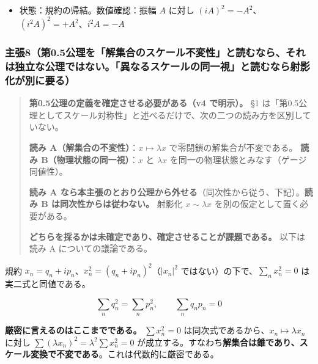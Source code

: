 \documentclass[
  10pt,
]{ltjsarticle}
\providecommand{\tightlist}{%
  \setlength{\itemsep}{0pt}\setlength{\parskip}{0pt}}
\begin{document}
\begin{itemize}
\tightlist
\item
  状態：規約の帰結。数値確認：振幅 \(A\) に対し
  \((iA)^2 = -A^2\)、\((i^2A)^2 = +A^2\)、\(i^2A = -A\)
\end{itemize}

\subsubsection{主張8（第0.5公理を「解集合のスケール不変性」と読むなら、それは独立な公理ではない。「異なるスケールの同一視」と読むなら射影化が別に要る）}\label{ux4e3bux5f358ux7b2c0.5ux516cux7406ux3092ux89e3ux96c6ux5408ux306eux30b9ux30b1ux30fcux30ebux4e0dux5909ux6027ux3068ux8aadux3080ux306aux3089ux305dux308cux306fux72ecux7acbux306aux516cux7406ux3067ux306fux306aux3044ux7570ux306aux308bux30b9ux30b1ux30fcux30ebux306eux540cux4e00ux8996ux3068ux8aadux3080ux306aux3089ux5c04ux5f71ux5316ux304cux5225ux306bux8981ux308b}

\begin{quote}
\textbf{第0.5公理の定義を確定させる必要がある（v4 で明示）。} §1
は「第0.5公理としてスケール対称性」と述べるだけで、次の二つの読み方を区別していない。

\textbf{読み A（解集合の不変性）}：\(x \mapsto \lambda x\)
で零閉鎖の解集合が不変である。 \textbf{読み
B（物理状態の同一視）}：\(x\) と \(\lambda x\)
を同一の物理状態とみなす（ゲージ同値性）。

\textbf{読み A
なら本主張のとおり公理から外せる}（同次性から従う、下記）。\textbf{読み
B は同次性からは従わない。} 射影化 \(x \sim \lambda x\)
を別の仮定として置く必要がある。

\textbf{どちらを採るかは未確定であり、確定させることが課題である。}
以下は読み A についての議論である。
\end{quote}

規約 \(x_n = q_n + ip_n\)、\(x_n^2 = (q_n+ip_n)^2\)（\(|x_n|^2\)
ではない）の下で、\(\sum_n x_n^2 = 0\) は実二式と同値である。

\[\sum_n q_n^2 = \sum_n p_n^2, \qquad \sum_n q_n p_n = 0\]

\textbf{厳密に言えるのはここまでである。} \(\sum x_n^2 = 0\)
は同次式であるから、\(x_n \mapsto \lambda x_n\) に対し
\(\sum(\lambda x_n)^2 = \lambda^2\sum x_n^2 = 0\)
が成立する。すなわち\textbf{解集合は錐であり、スケール変換で不変である}。これは代数的に厳密である。
\end{document}
